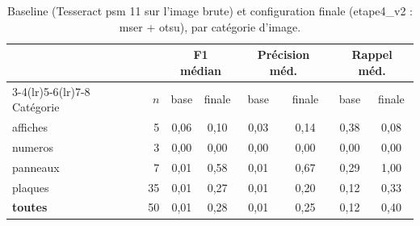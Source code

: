 \begin{table}[htbp]
\centering
\small
\begin{tabular}{lrcccccc}
\toprule
 & & \multicolumn{2}{c}{F1 médian} & \multicolumn{2}{c}{Précision méd.} & \multicolumn{2}{c}{Rappel méd.} \\
\cmidrule(lr){3-4}\cmidrule(lr){5-6}\cmidrule(lr){7-8}
Catégorie & $n$ & base & finale & base & finale & base & finale \\
\midrule
affiches & 5 & 0{,}06 & 0{,}10 & 0{,}03 & 0{,}14 & 0{,}38 & 0{,}08 \\
numeros & 3 & 0{,}00 & 0{,}00 & 0{,}00 & 0{,}00 & 0{,}00 & 0{,}00 \\
panneaux & 7 & 0{,}01 & 0{,}58 & 0{,}01 & 0{,}67 & 0{,}29 & 1{,}00 \\
plaques & 35 & 0{,}01 & 0{,}27 & 0{,}01 & 0{,}20 & 0{,}12 & 0{,}33 \\
\midrule
\textbf{toutes} & 50 & 0{,}01 & 0{,}28 & 0{,}01 & 0{,}25 & 0{,}12 & 0{,}40 \\
\bottomrule
\end{tabular}
\caption{Baseline (Tesseract psm 11 sur l'image brute) et configuration finale (etape4\_v2 : mser + otsu), par catégorie d'image.}
\label{tab:categories}
\end{table}

